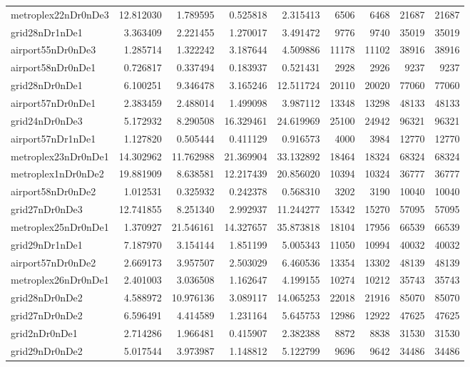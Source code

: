 \begin{longtable}{|l|r|r|r|r|r|r|r|r|}
metroplex22nDr0nDe3 & 12.812030 & 1.789595 & 0.525818 & 2.315413 & 6506 & 6468 & 21687 & 21687 \\
grid28nDr1nDe1 & 3.363409 & 2.221455 & 1.270017 & 3.491472 & 9776 & 9740 & 35019 & 35019 \\
airport55nDr0nDe3 & 1.285714 & 1.322242 & 3.187644 & 4.509886 & 11178 & 11102 & 38916 & 38916 \\
airport58nDr0nDe1 & 0.726817 & 0.337494 & 0.183937 & 0.521431 & 2928 & 2926 & 9237 & 9237 \\
grid28nDr0nDe1 & 6.100251 & 9.346478 & 3.165246 & 12.511724 & 20110 & 20020 & 77060 & 77060 \\
airport57nDr0nDe1 & 2.383459 & 2.488014 & 1.499098 & 3.987112 & 13348 & 13298 & 48133 & 48133 \\
grid24nDr0nDe3 & 5.172932 & 8.290508 & 16.329461 & 24.619969 & 25100 & 24942 & 96321 & 96321 \\
airport57nDr1nDe1 & 1.127820 & 0.505444 & 0.411129 & 0.916573 & 4000 & 3984 & 12770 & 12770 \\
metroplex23nDr0nDe1 & 14.302962 & 11.762988 & 21.369904 & 33.132892 & 18464 & 18324 & 68324 & 68324 \\
metroplex1nDr0nDe2 & 19.881909 & 8.638581 & 12.217439 & 20.856020 & 10394 & 10324 & 36777 & 36777 \\
airport58nDr0nDe2 & 1.012531 & 0.325932 & 0.242378 & 0.568310 & 3202 & 3190 & 10040 & 10040 \\
grid27nDr0nDe3 & 12.741855 & 8.251340 & 2.992937 & 11.244277 & 15342 & 15270 & 57095 & 57095 \\
metroplex25nDr0nDe1 & 1.370927 & 21.546161 & 14.327657 & 35.873818 & 18104 & 17956 & 66539 & 66539 \\
grid29nDr1nDe1 & 7.187970 & 3.154144 & 1.851199 & 5.005343 & 11050 & 10994 & 40032 & 40032 \\
airport57nDr0nDe2 & 2.669173 & 3.957507 & 2.503029 & 6.460536 & 13354 & 13302 & 48139 & 48139 \\
metroplex26nDr0nDe1 & 2.401003 & 3.036508 & 1.162647 & 4.199155 & 10274 & 10212 & 35743 & 35743 \\
grid28nDr0nDe2 & 4.588972 & 10.976136 & 3.089117 & 14.065253 & 22018 & 21916 & 85070 & 85070 \\
grid27nDr0nDe2 & 6.596491 & 4.414589 & 1.231164 & 5.645753 & 12986 & 12922 & 47625 & 47625 \\
grid2nDr0nDe1 & 2.714286 & 1.966481 & 0.415907 & 2.382388 & 8872 & 8838 & 31530 & 31530 \\
grid29nDr0nDe2 & 5.017544 & 3.973987 & 1.148812 & 5.122799 & 9696 & 9642 & 34486 & 34486 \\

\end{longtable}
